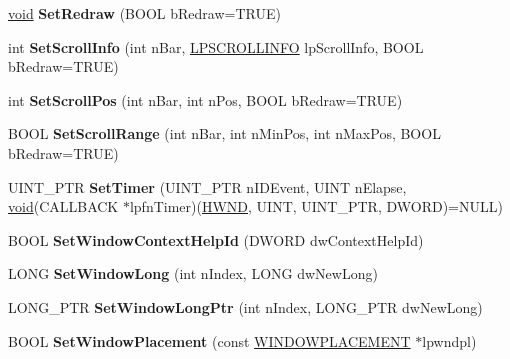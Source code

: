 \begin{DoxyCompactItemize}
\hyperlink{interfacevoid}{void} {\bfseries Set\+Redraw} (B\+O\+OL b\+Redraw=T\+R\+UE)
\item 
\mbox{\label{class_a_t_l_1_1_c_window_ad068ae80d53387f4d145e95ac03cc498}} 
int {\bfseries Set\+Scroll\+Info} (int n\+Bar, \hyperlink{structtag_s_c_r_o_l_l_i_n_f_o}{L\+P\+S\+C\+R\+O\+L\+L\+I\+N\+FO} lp\+Scroll\+Info, B\+O\+OL b\+Redraw=T\+R\+UE)
\item 
\mbox{\label{class_a_t_l_1_1_c_window_a98de4aee65bc60c4d3fb52b908152b28}} 
int {\bfseries Set\+Scroll\+Pos} (int n\+Bar, int n\+Pos, B\+O\+OL b\+Redraw=T\+R\+UE)
\item 
\mbox{\label{class_a_t_l_1_1_c_window_a1abb4e214024931a6ce5d5b7019c8068}} 
B\+O\+OL {\bfseries Set\+Scroll\+Range} (int n\+Bar, int n\+Min\+Pos, int n\+Max\+Pos, B\+O\+OL b\+Redraw=T\+R\+UE)
\item 
\mbox{\label{class_a_t_l_1_1_c_window_a04e0b1416817a80dcb6a8527c6eebb59}} 
U\+I\+N\+T\+\_\+\+P\+TR {\bfseries Set\+Timer} (U\+I\+N\+T\+\_\+\+P\+TR n\+I\+D\+Event, U\+I\+NT n\+Elapse, \hyperlink{interfacevoid}{void}(C\+A\+L\+L\+B\+A\+CK $\ast$lpfn\+Timer)(\hyperlink{interfacevoid}{H\+W\+ND}, U\+I\+NT, U\+I\+N\+T\+\_\+\+P\+TR, D\+W\+O\+RD)=N\+U\+LL)
\item 
\mbox{\label{class_a_t_l_1_1_c_window_a2d588c6e69b14c00f9064c8a294b7854}} 
B\+O\+OL {\bfseries Set\+Window\+Context\+Help\+Id} (D\+W\+O\+RD dw\+Context\+Help\+Id)
\item 
\mbox{\label{class_a_t_l_1_1_c_window_a9b3f5dfbc8adc06879acf2d2d41b95aa}} 
L\+O\+NG {\bfseries Set\+Window\+Long} (int n\+Index, L\+O\+NG dw\+New\+Long)
\item 
\mbox{\label{class_a_t_l_1_1_c_window_ab9c5c1281b7e944fe00aa8c5bb5db09b}} 
L\+O\+N\+G\+\_\+\+P\+TR {\bfseries Set\+Window\+Long\+Ptr} (int n\+Index, L\+O\+N\+G\+\_\+\+P\+TR dw\+New\+Long)
\item 
\mbox{\label{class_a_t_l_1_1_c_window_a9e04361c6caa50182ac9bc7ec199e475}} 
B\+O\+OL {\bfseries Set\+Window\+Placement} (const \hyperlink{struct___w_i_n_d_o_w_p_l_a_c_e_m_e_n_t}{W\+I\+N\+D\+O\+W\+P\+L\+A\+C\+E\+M\+E\+NT} $\ast$lpwndpl)

\end{DoxyCompactItemize}
